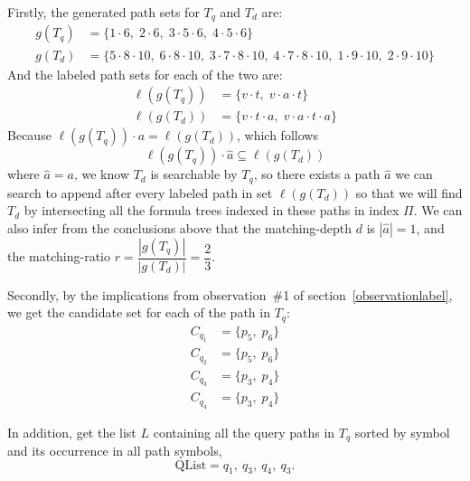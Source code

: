 Firstly, the generated path sets for $T_q$ and $T_d$ are:
$$
\begin{aligned}
g(T_q) &= \{ 1\cdot6,\; 2\cdot6,\; 3\cdot5\cdot6,\; 4\cdot5\cdot6\} \\
g(T_d) &= \{ 5\cdot8\cdot10,\; 6\cdot8\cdot10,\; 3\cdot7\cdot8\cdot10,\; 4\cdot7\cdot8\cdot10,\; 1\cdot9\cdot10,\; 2\cdot9\cdot10\}
\end{aligned}
$$
And the labeled path sets for each of the two are:
$$
\begin{aligned}
\ell\left(g(T_q)\right) &= \{ v\cdot t,\; v\cdot a\cdot t \} \\
\ell\left(g(T_d)\right) &= \{ v\cdot t\cdot a,\; v\cdot a\cdot t \cdot a \}
\end{aligned}
$$
Because $\ell\left(g(T_q)\right) \cdot a = \ell\left(g(T_d)\right)$, which follows 
$$
\ell(g(T_q)) \cdot \hat{a} \subseteq \ell(g(T_d))
$$
where $\hat{a} = a$, 
we know $T_d$ is searchable by $T_q$, so there exists a path $\hat{a}$ we can search to append after every labeled path in set $\ell\left(g(T_d)\right)$ so that we will find $T_d$ by intersecting all the formula trees indexed in these paths in index $\Pi$.
We can also infer from the conclusions above that the matching-depth $d$ is $|\hat{a}| = 1$, and the matching-ratio $r=\dfrac{|g(T_q)|}{|g(T_d)|} = \dfrac{2}{3}$. 

Secondly, by the implications from observation~\#1 of section~\ref{observationlabel}, we get the candidate set for each of the path in $T_q$:
$$
\begin{aligned}
C_{q_1} &= \{ p_5,\; p_6 \} \\
C_{q_2} &= \{ p_5,\; p_6 \} \\
C_{q_3} &= \{ p_3,\; p_4 \} \\
C_{q_4} &= \{ p_3,\; p_4 \} 
\end{aligned}
$$

In addition, get the list $L$ containing all the query paths in $T_q$ sorted by symbol and its occurrence in all path symbols, 
$$
\mathrm{QList} = q_1,\ q_3,\ q_4,\ q_3.
$$


